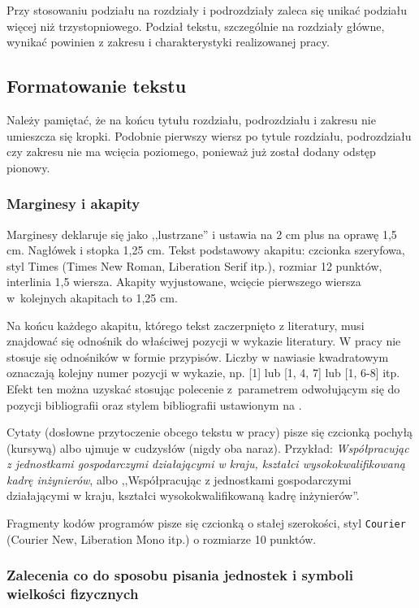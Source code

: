 \documentclass[12pt,twoside]{article}
\begin{document}
Przy stosowaniu podziału na rozdziały i podrozdziały zaleca się unikać podziału więcej niż trzystopniowego. Podział tekstu, szczególnie na rozdziały główne, wynikać powinien z zakresu i charakterystyki realizowanej pracy.

\subsection{Formatowanie tekstu}

Należy pamiętać, że na końcu tytułu rozdziału, podrozdziału i zakresu nie umieszcza się kropki.
Podobnie pierwszy wiersz po tytule rozdziału, podrozdziału czy zakresu nie ma wcięcia poziomego, ponieważ już został dodany odstęp pionowy.

\subsubsection{Marginesy i akapity}

Marginesy deklaruje się jako ,,lustrzane'' i ustawia na 2 cm plus na oprawę 1,5 cm. 
Nagłówek i stopka 1,25 cm.
Tekst podstawowy akapitu: czcionka szeryfowa, styl Times (Times New Roman, Liberation Serif itp.), rozmiar 12 punktów, interlinia 1,5 wiersza.
Akapity wyjustowane, wcięcie pierwszego wiersza w~kolejnych akapitach to 1,25 cm. 

Na końcu każdego akapitu, którego tekst zaczerpnięto z literatury, musi znajdować się odnośnik do właściwej pozycji w wykazie literatury. 
W pracy nie stosuje się odnośników w formie przypisów.
Liczby w nawiasie kwadratowym oznaczają kolejny numer pozycji w wykazie, np. [1] lub [1, 4, 7] lub [1, 6-8] itp.
Efekt ten można uzyskać stosując polecenie  z~parametrem odwołującym się do pozycji bibliografii oraz stylem bibliografii ustawionym na .

Cytaty (dosłowne przytoczenie obcego tekstu w pracy) pisze się czcionką pochyłą (kursywą) albo ujmuje w cudzysłów (nigdy oba naraz). Przykład: \emph{Współpracując z jednostkami gospodarczymi działającymi w kraju, kształci wysokokwalifikowaną kadrę inżynierów}, albo ,,Współpracując z jednostkami gospodarczymi działającymi w kraju, kształci wysokokwalifikowaną kadrę inżynierów''.

Fragmenty kodów programów pisze się czcionką o stałej szerokości, styl \footnotesize {\texttt{Courier}}
\normalsize{(Courier New, Liberation Mono itp.) o rozmiarze 10 punktów.}


\subsubsection{Zalecenia co do sposobu pisania jednostek i symboli wielkości fizycznych}
\end{document}

